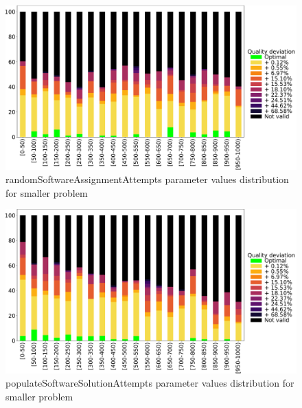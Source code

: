 \begin{figure}
	\centering
	\includegraphics[width=\textwidth]{images/DistrObj/randomSoftwareAssignmentAttempts.pdf}
	\caption[randomSoftwareAssignmentAttempts parameter values distribution for smaller problem]{randomSoftwareAssignmentAttempts parameter values distribution for smaller problem}
	\label{fig:randomSoftwareAssignmentAttempts_Obj}
\end{figure}

\begin{figure}
	\centering
	\includegraphics[width=\textwidth]{images/DistrObj/populateSoftwareSolutionAttempts.pdf}
	\caption[populateSoftwareSolutionAttempts parameter values distribution for smaller problem]{populateSoftwareSolutionAttempts parameter values distribution for smaller problem}
	\label{fig:populateSoftwareSolutionAttempts_Obj}
\end{figure}